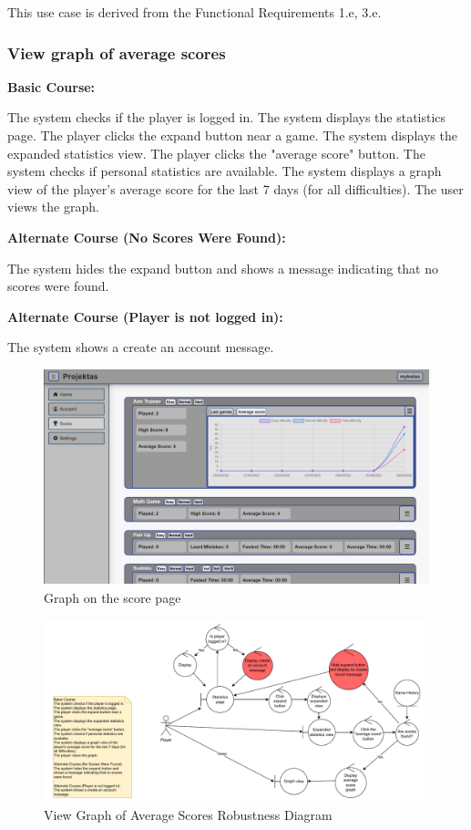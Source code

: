 \documentclass[11pt,a4paper]{article}
\newcommand{\heading}[1]{\vspace{1em}\noindent\textbf{#1}\par\vspace{0.5em}}
\begin{document}
This use case is derived from the Functional Requirements 1.e, 3.e.


\subsubsection{View graph of average scores}


\heading{Basic Course:}
The system checks if the player is logged in. The system displays the statistics page. The player clicks the expand button near a
game. The system displays the expanded statistics
view. The player clicks the "average score" button. The system checks if personal statistics are available. The system displays a graph view of the player's average score for the last 7 days (for all difficulties). The user views the graph.

\heading{Alternate Course (No Scores Were Found):}
The system hides the expand button and shows a message indicating that no scores were found.

\heading{Alternate Course (Player is not logged in):}
The system shows a create an account message.

\begin{figure}[H]
    \centering
    \includegraphics[width=1\textwidth,keepaspectratio]{PSI_3rd_trial/PNGs/graph_of_average_scores.png}
    \caption{Graph on the score page}
    \label{fig:graph_of_average_scores}
\end{figure}

\begin{figure}[H]
    \centering
    \includegraphics[width=1\textwidth,keepaspectratio]{PSI_3rd_trial/robustness/graph_stats.drawio.pdf}
    \caption{View Graph of Average Scores Robustness Diagram}
    \label{fig:average_statistics_view_diagram}
\end{figure}
\end{document}
